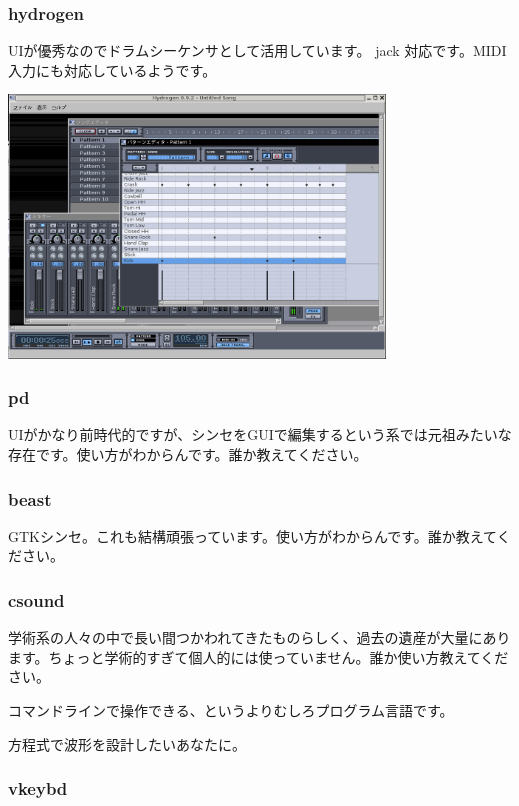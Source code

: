 \documentclass[mingoth,a4paper]{jsarticle}
\begin{document}
\subsubsection{hydrogen}

UIが優秀なのでドラムシーケンサとして活用しています。
jack 対応です。MIDI入力にも対応しているようです。

\includegraphics[width=10cm]{image200602/hydrogen.png}

\subsubsection{pd}

UIがかなり前時代的ですが、シンセをGUIで編集するという系では元祖みたいな
存在です。使い方がわからんです。誰か教えてください。

\subsubsection{beast}

GTKシンセ。これも結構頑張っています。使い方がわからんです。誰か教えてください。

\subsubsection{csound}

学術系の人々の中で長い間つかわれてきたものらしく、過去の遺産が大量にあり
ます。ちょっと学術的すぎて個人的には使っていません。誰か使い方教えてくだ
さい。

コマンドラインで操作できる、というよりむしろプログラム言語です。

方程式で波形を設計したいあなたに。

\subsubsection{vkeybd}
\end{document}
